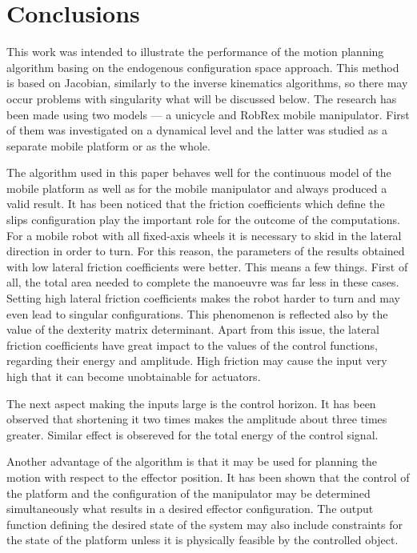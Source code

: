\chapter{Conclusions}
\label{ch:concl}
This work was intended to illustrate the performance of the motion planning algorithm
basing on the endogenous configuration space approach. This method is based on Jacobian,
similarly to the inverse kinematics algorithms, so there may occur problems with
singularity what will be discussed below.
The research has been made 
using two models --- a unicycle and RobRex mobile manipulator. First of them was investigated
on a dynamical level and the latter was studied as a separate mobile platform or as the whole.

The algorithm used in this paper behaves well for the continuous model of the mobile platform
as well as for the mobile manipulator and always produced a valid result.
It has been noticed that the friction coefficients which
define the slips configuration play the important role for the outcome of the computations.
For a mobile robot with all fixed-axis wheels it is necessary to skid in the lateral direction
in order to turn. For this reason, the parameters of the results obtained with low lateral friction
coefficients were better. This means a few things. First of all, the total area needed to
complete the manoeuvre was far less in these cases. Setting high lateral friction
coefficients makes the robot harder to turn and may even lead to singular configurations.
This phenomenon is reflected also by the value of the dexterity matrix determinant.
Apart from this issue, the lateral friction coefficients have great impact to the values
of the control functions, regarding their energy and amplitude. High friction may cause
the input very high that it can become unobtainable for actuators.

The next aspect making the inputs large is the control horizon. It has been observed that shortening
it two times makes the amplitude about three times greater. Similar effect is obsereved
for the total energy of the control signal.

Another advantage of the algorithm is that it may be used for planning the motion with respect
to the effector position. It has been shown that the control of the platform and the configuration
of the manipulator may be determined simultaneously what results in a desired effector configuration.
The output function defining the desired state of the system may also include constraints
for the state of the platform unless it is physically feasible by the controlled object.

